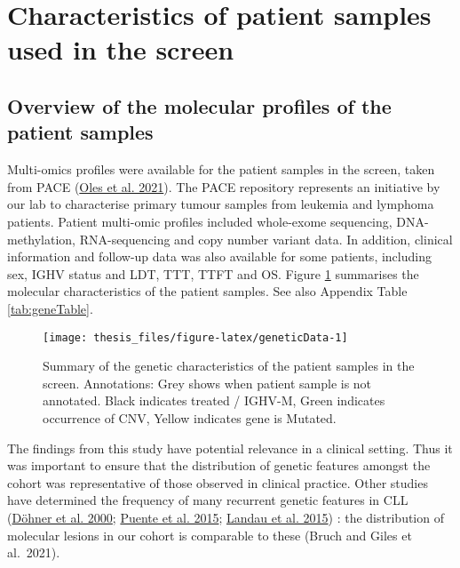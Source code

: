\documentclass[11pt, a4paper, twosided]{book}
\begin{document}
\hypertarget{characteristics-of-patient-samples-used-in-the-screen}{%
\section{Characteristics of patient samples used in the screen}\label{characteristics-of-patient-samples-used-in-the-screen}}

\hypertarget{overview-of-the-molecular-profiles-of-the-patient-samples}{%
\subsection{Overview of the molecular profiles of the patient samples}\label{overview-of-the-molecular-profiles-of-the-patient-samples}}

Multi-omics profiles were available for the patient samples in the screen, taken from PACE (\protect\hyperlink{ref-R-BloodCancerMultiOmics2017}{Oles et al. 2021}). The PACE repository represents an initiative by our lab to characterise primary tumour samples from leukemia and lymphoma patients. Patient multi-omic profiles included whole-exome sequencing, DNA-methylation, RNA-sequencing and copy number variant data. In addition, clinical information and follow-up data was also available for some patients, including sex, IGHV status and LDT, TTT, TTFT and OS. Figure \ref{fig:geneticData} summarises the molecular characteristics of the patient samples. See also Appendix Table \ref{tab:geneTable}.


\begin{figure}[h]

{\centering \texttt{[image: thesis\_files/figure-latex/geneticData-1]} 

}

\caption{Summary of the genetic characteristics of the patient samples in the screen. Annotations: Grey shows when patient sample is not annotated. Black indicates treated / IGHV-M, Green indicates occurrence of CNV, Yellow indicates gene is Mutated.}\label{fig:geneticData}
\end{figure}
The findings from this study have potential relevance in a clinical setting. Thus it was important to ensure that the distribution of genetic features amongst the cohort was representative of those observed in clinical practice. Other studies have determined the frequency of many recurrent genetic features in CLL (\protect\hyperlink{ref-Dohner2000}{Döhner et al. 2000}; \protect\hyperlink{ref-Puente2015}{Puente et al. 2015}; \protect\hyperlink{ref-Landau2015}{Landau et al. 2015}) : the distribution of molecular lesions in our cohort is comparable to these (Bruch and Giles et al.~2021).
\end{document}
